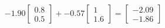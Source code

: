 \documentclass[preview]{standalone}
\begin{document}
\begin{align*}
-1.90 \begin{bmatrix} 0.8 \\ 0.5 \end{bmatrix} + -0.57 \begin{bmatrix} 1 \\ 1.6 \end{bmatrix} = \begin{bmatrix} -2.09 \\ -1.86 \end{bmatrix}
\end{align*}
\end{document}
